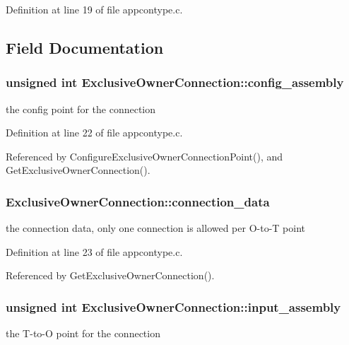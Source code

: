 \-Definition at line 19 of file appcontype.\-c.



\subsection{\-Field \-Documentation}
\hypertarget{structExclusiveOwnerConnection_a44eec9298e01ff013629d3ff2133f12c}{
\subsubsection[{config\-\_\-assembly}]{\setlength{\rightskip}{0pt plus 5cm}unsigned int {\bf \-Exclusive\-Owner\-Connection\-::config\-\_\-assembly}}}\label{d7/d95/structExclusiveOwnerConnection_a44eec9298e01ff013629d3ff2133f12c}
the config point for the connection 

\-Definition at line 22 of file appcontype.\-c.



\-Referenced by \-Configure\-Exclusive\-Owner\-Connection\-Point(), and \-Get\-Exclusive\-Owner\-Connection().

\hypertarget{structExclusiveOwnerConnection_a02eadcfece1cc9b42d0559f21857bb17}{
\subsubsection[{connection\-\_\-data}]{ {\bf \-Exclusive\-Owner\-Connection\-::connection\-\_\-data}}}\label{d7/d95/structExclusiveOwnerConnection_a02eadcfece1cc9b42d0559f21857bb17}
the connection data, only one connection is allowed per \-O-\/to-\/\-T point 

\-Definition at line 23 of file appcontype.\-c.



\-Referenced by \-Get\-Exclusive\-Owner\-Connection().

\hypertarget{structExclusiveOwnerConnection_a69ee3199554492e4b1b8af8c69e65e5f}{
\subsubsection[{input\-\_\-assembly}]{\setlength{\rightskip}{0pt plus 5cm}unsigned int {\bf \-Exclusive\-Owner\-Connection\-::input\-\_\-assembly}}}\label{d7/d95/structExclusiveOwnerConnection_a69ee3199554492e4b1b8af8c69e65e5f}
the \-T-\/to-\/\-O point for the connection 

